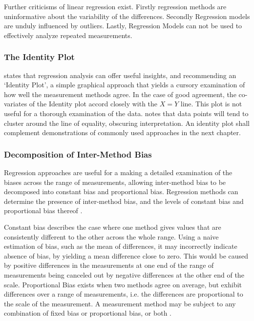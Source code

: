 \documentclass[12pt, a4paper]{report}
\theoremstyle{plain}
\theoremstyle{definition}
\theoremstyle{remark}
\begin{document}
	Further criticisms of linear regression exist.
	Firstly regression methods are uninformative about the variability of the differences. Secondly Regression models are unduly influenced by outliers. Lastly, Regression Models can not be used to effectively analyze repeated measurements.	

		

	
 

	
	\subsubsection{The Identity Plot}
	\citet{BA83} states that regression analysis can offer useful insights, and recommending an `Identity Plot', a simple graphical approach that yields a cursory examination of how well the measurement methods agree. In the case of good agreement, the co-variates of the Identity plot accord closely with the $X=Y$ line. This plot is not useful for a thorough examination of the data. \citet{BritHypSoc} notes that data points will tend to cluster around the line of equality,
	obscuring interpretation. An identity plot shall complement demonstrations of commonly used approaches in the next chapter.
	
	
	\subsubsection{Decomposition of Inter-Method Bias}
Regression approaches are useful for a making a detailed examination of the biases across the range of measurements, allowing inter-method bias to be decomposed into constant bias and proportional bias. Regression methods can determine the presence of inter-method bias, and the levels of constant bias and proportional bias thereof \cite{ludbrook97,ludbrook02}. 

Constant bias describes the case where one method gives values that are consistently different to the other across the whole range. Using a naive estimation of bias, such as the mean of differences, it may incorrectly indicate absence of bias, by yielding a mean difference close to zero. This would be caused by positive differences in the measurements at one end of the range of measurements being canceled out by negative differences at the other end of the scale. Proportional Bias exists when two methods agree on average, but exhibit differences over a range of measurements, i.e. the differences are proportional to the scale of the measurement.
	A measurement method may be subject to any combination of fixed bias or proportional bias, or both \citep{ludbrook02}. 
	
\end{document}
